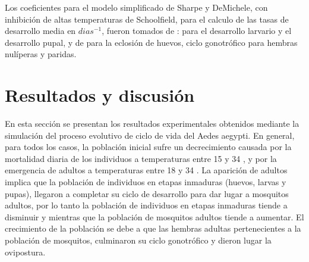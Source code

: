 Los coeficientes para el modelo simplificado de Sharpe y DeMichele, con inhibición de altas
temperaturas de Schoolfield, para el calculo de las tasas de desarrollo media en $dias^{-1}$,
fueron tomados de :  \cite{rueda1990temperature} para el desarrollo larvario y el desarrollo
pupal, y de  \cite{otero2006stochastic} para la eclosión de huevos, ciclo gonotrófico para hembras
nulíperas y paridas.

\section{Resultados y discusión}
En esta sección se presentan los resultados experimentales obtenidos mediante la simulación del
proceso evolutivo de ciclo de vida del Aedes aegypti. En general, para todos los casos, la
población inicial sufre un decrecimiento causada por la mortalidad diaria de los individuos a
temperaturas entre 15 y 34 \textcelsius, y por la emergencia de adultos a temperaturas entre 18 y
34 \textcelsius. La aparición de adultos implica que la población de individuos en etapas
inmaduras (huevos, larvas y pupas), llegaron a completar su ciclo de desarrollo para dar lugar a
mosquitos adultos, por lo tanto la población de individuos en etapas inmaduras tiende a disminuir
y mientras que la población de mosquitos adultos tiende a aumentar. El crecimiento de la población
se debe a que las hembras adultas pertenecientes a la población de mosquitos, culminaron su ciclo
gonotrófico y dieron lugar la ovipostura.

